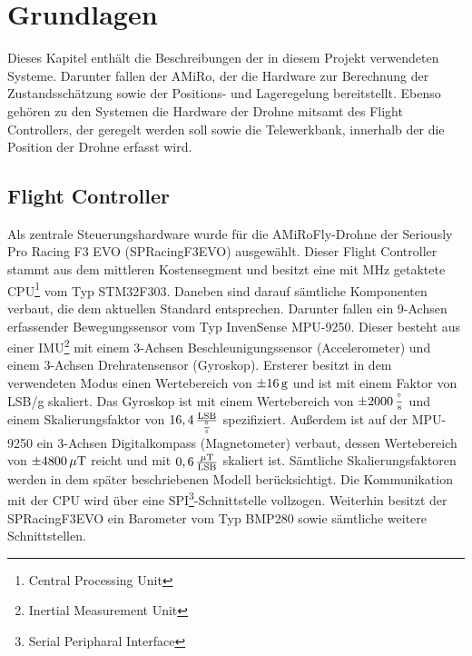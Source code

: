 \section{Grundlagen}\label{kapitel1}
Dieses Kapitel enthält die Beschreibungen der in diesem Projekt verwendeten Systeme. Darunter fallen der AMiRo, der die Hardware zur Berechnung der Zustandsschätzung sowie der Positions- und Lageregelung bereitstellt. Ebenso gehören zu den Systemen die Hardware der Drohne mitsamt des Flight Controllers, der geregelt werden soll sowie die Telewerkbank, innerhalb der die Position der Drohne erfasst wird.
\subsection{Flight Controller}
Als zentrale Steuerungshardware wurde für die AMiRoFly-Drohne der Seriously Pro Racing F3 EVO (SPRacingF3EVO) ausgewählt. Dieser Flight Controller stammt aus dem mittleren Kostensegment und besitzt eine mit \unit[72]{MHz} getaktete CPU\footnote{Central Processing Unit} vom Typ STM32F303. Daneben sind darauf sämtliche Komponenten verbaut, die dem aktuellen Standard entsprechen. Darunter fallen ein 9-Achsen erfassender Bewegungssensor vom Typ InvenSense MPU-9250. Dieser besteht aus einer IMU\footnote{Inertial Measurement Unit} mit einem 3-Achsen Beschleunigungssensor (Accelerometer) und einem 3-Achsen Drehratensensor (Gyroskop). Ersterer besitzt in dem verwendeten Modus einen Wertebereich von $\pm \unit[16]{g}$ und ist mit einem Faktor von \unit[2048]{LSB/g} skaliert. Das Gyroskop ist mit einem Wertebereich von $\pm \unit[2000]{\frac{^\circ}{s}}$ und einem Skalierungsfaktor von $\unit[16,4]{\frac{LSB}{\frac{^\circ}{s}}}$ spezifiziert. Außerdem ist auf der MPU-9250 ein 3-Achsen Digitalkompass (Magnetometer) verbaut, dessen Wertebereich von $\pm \unit[4800]{\mu T}$ reicht und mit $\unit[0,6]{\frac{\mu T}{LSB}}$ skaliert ist. Sämtliche Skalierungsfaktoren werden in dem später beschriebenen Modell berücksichtigt. Die Kommunikation mit der CPU wird über eine SPI\footnote{Serial Peripharal Interface}-Schnittstelle vollzogen. Weiterhin besitzt der SPRacingF3EVO ein Barometer vom Typ BMP280 sowie sämtliche weitere Schnittstellen.


